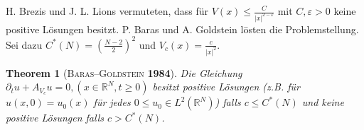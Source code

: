 \documentclass[handout]{beamer}
\newtheorem{thm}{Theorem}
\theoremstyle{break}
\begin{document}
\begin{frame}
H. Brezis und J. L. Lions vermuteten, dass f\"ur $V(x) \le \frac{C}{|x|^{2-\varepsilon}}$ mit $C, \varepsilon>0$ keine positive L\"osungen besitzt. P. Baras und A. Goldstein l\"osten die Problemstellung.  Sei dazu $C^*(N)=( \tfrac{N-2}{2} )^2$ und $V_c(x) = \frac{c}{|x|^2}$. \vspace{.25cm}

\begin{thm}[\textsc{Baras--Goldstein} \textbf{1984}]\label{main}
Die Gleichung  $\partial_t u + A_{V_c} u =0, (x\in \mathbb R^N, t\ge0)$ besitzt positive L\"osungen (z.B. f\"ur $u(x,0)=u_0(x)$ f\"ur jedes $0\le u_0\in L^2(\mathbb R^N)$) falls $c\le C^*(N)$ und keine positive L\"osungen falls $c>C^*(N)$.
\end{thm}
\end{frame}
\end{document}
